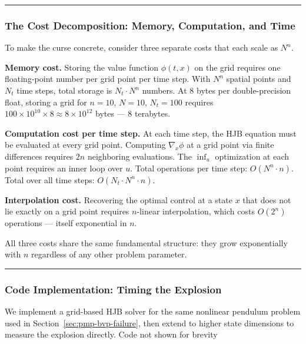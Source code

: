 \documentclass{article}
\begin{document}
\medskip\hrule\medskip

\subsubsection{The Cost Decomposition: Memory, Computation, and Time}

\begin{compnumissuesbox}
To make the curse concrete, consider three separate costs that each scale as $N^n$.

\textbf{Memory cost.} Storing the value function $\phi(t, x)$ on the grid requires one floating-point number per grid point per time step. With $N^n$ spatial points and $N_t$ time steps, total storage is $N_t \cdot N^n$ numbers. At 8 bytes per double-precision float, storing a grid for $n = 10$, $N = 10$, $N_t = 100$ requires $100 \times 10^{10} \times 8 \approx 8 \times 10^{12}$ bytes --- 8 terabytes.

\textbf{Computation cost per time step.} At each time step, the HJB equation must be evaluated at every grid point. Computing $\nabla_x \phi$ at a grid point via finite differences requires $2n$ neighboring evaluations. The $\inf_u$ optimization at each point requires an inner loop over $u$. Total operations per time step: $O(N^n \cdot n)$. Total over all time steps: $O(N_t \cdot N^n \cdot n)$.

\textbf{Interpolation cost.} Recovering the optimal control at a state $x$ that does not lie exactly on a grid point requires $n$-linear interpolation, which costs $O(2^n)$ operations --- itself exponential in $n$.

All three costs share the same fundamental structure: they grow exponentially with $n$ regardless of any other problem parameter.
\end{compnumissuesbox}

\medskip\hrule\medskip

\subsubsection{Code Implementation: Timing the Explosion}

We implement a grid-based HJB solver for the same nonlinear pendulum problem used in Section~\ref{sec:pmp-bvp-failure}, then extend to higher state dimensions to measure the explosion directly.
Code not shown for brevity
\end{document}
